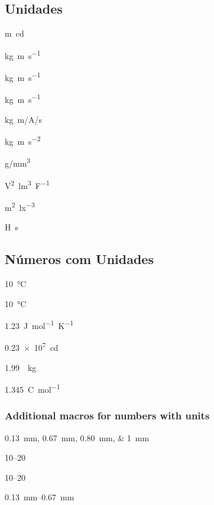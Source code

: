 \documentclass[11pt, a4paper]{article}
\begin{document}
    \subsection*{Unidades}

    \unit{\m\candela} \par
    \unit{kg.m.s^{-1}} \par
    \unit{\kilogram\metre\per\second} \par
    \unit{\kg\m\per\s} \par
    \unit[per-mode = symbol]{\kilogram\metre\per\ampere\per\second}\par
    \unit{\kilo\gram\metre\per\square\second} \par
    \unit[per-mode = symbol]{\gram\per\cubic\milli\metre} \par
    \unit{\square\volt\cubic\lumen\per\farad} \par
    \unit{\metre\squared\per\cubic\lux} \par
    \unit{\henry\second}

    \subsection*{Números com Unidades}

    \qty{10}{\celsius} \par
    \qty{10}{\degreeCelsius} \par
    \qty{1.23}{J.mol^{-1}.K^{-1}} \par
    \qty{.23e7}{\candela} \par
    \qty[per-mode = symbol]{1.99}{\per\kilogram} \par
    \qty[per-mode = fraction]{1,345}{\coulomb\per\mole}

    \subsubsection*{Additional macros for numbers with units}

    \qtylist{0.13;0.67;0.80;1}{\milli\metre}\par
     \par
     \par
    \numrange{10}{20} \par
    \numrange[range-phrase=--]{10}{20} \par
    \qtyrange{0.13}{0.67}{\milli\metre} \par
%    
%    
\end{document}
